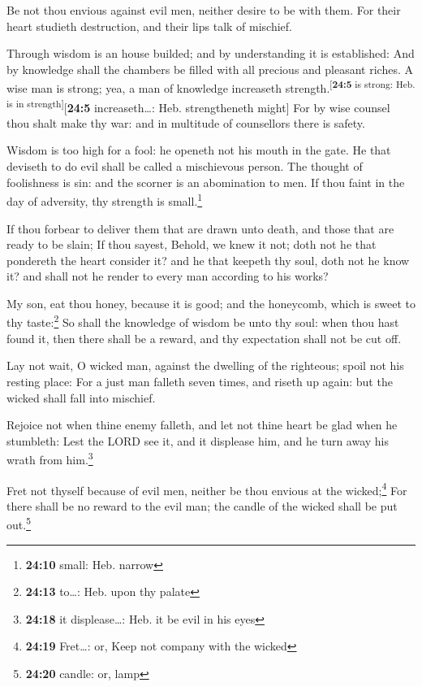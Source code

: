  Be not thou envious against evil men, neither desire to
be with them.  For their heart studieth destruction, and
their lips talk of mischief.

 Through wisdom is an house builded; and by understanding
it is established:  And by knowledge shall the chambers be
filled with all precious and pleasant riches.  A wise man
is strong; yea, a man of knowledge increaseth
strength.\textsuperscript{{[}\textbf{24:5} is strong: Heb. is in
strength{]}}{[}\textbf{24:5} increaseth\ldots: Heb. strengtheneth
might{]}  For by wise counsel thou shalt make thy war: and
in multitude of counsellors there is safety.

 Wisdom is too high for a fool: he openeth not his mouth
in the gate.  He that deviseth to do evil shall be called
a mischievous person.  The thought of foolishness is sin:
and the scorner is an abomination to men.  If thou faint
in the day of adversity, thy strength is small.\footnote{\textbf{24:10}
  small: Heb. narrow}

 If thou forbear to deliver them that are drawn unto
death, and those that are ready to be slain;  If thou
sayest, Behold, we knew it not; doth not he that pondereth the heart
consider it? and he that keepeth thy soul, doth not he know it? and
shall not he render to every man according to his works?

 My son, eat thou honey, because it is good; and the
honeycomb, which is sweet to thy taste:\footnote{\textbf{24:13}
  to\ldots: Heb. upon thy palate}  So shall the knowledge
of wisdom be unto thy soul: when thou hast found it, then there shall be
a reward, and thy expectation shall not be cut off.

 Lay not wait, O wicked man, against the dwelling of the
righteous; spoil not his resting place:  For a just man
falleth seven times, and riseth up again: but the wicked shall fall into
mischief.

 Rejoice not when thine enemy falleth, and let not thine
heart be glad when he stumbleth:  Lest the LORD see it,
and it displease him, and he turn away his wrath from him.\footnote{\textbf{24:18}
  it displease\ldots: Heb. it be evil in his eyes}

 Fret not thyself because of evil men, neither be thou
envious at the wicked;\footnote{\textbf{24:19} Fret\ldots: or, Keep not
  company with the wicked}  For there shall be no reward
to the evil man; the candle of the wicked shall be put out.\footnote{\textbf{24:20}
  candle: or, lamp}

